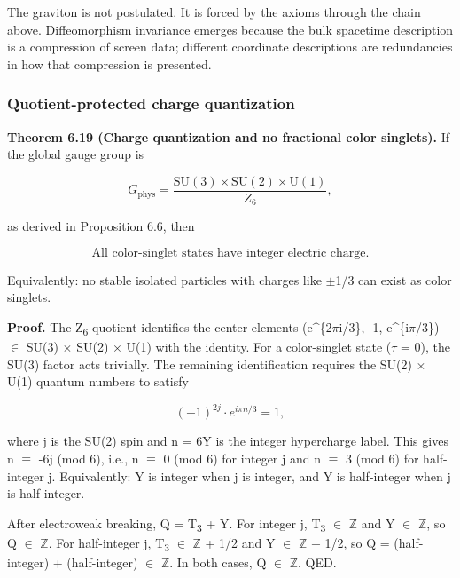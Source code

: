 The graviton is not postulated. It is forced by the axioms through the chain above. Diffeomorphism invariance emerges because the bulk spacetime description is a compression of screen data; different coordinate descriptions are redundancies in how that compression is presented.

\subsubsection{Quotient-protected charge quantization}\label{612-mass-predictions-from-symmetry}

\textbf{Theorem 6.19 (Charge quantization and no fractional color singlets).} If the global gauge group is

\[
G_{\mathrm{phys}} = \frac{\mathrm{SU}(3) \times \mathrm{SU}(2) \times \mathrm{U}(1)}{Z_6},
\]

as derived in Proposition 6.6, then

\[
\text{All color-singlet states have integer electric charge.}
\]

Equivalently: no stable isolated particles with charges like \ensuremath{\pm}1/3 can exist as color singlets.

\textbf{Proof.} The Z\textsubscript{6} quotient identifies the center elements (e\^{}\{2\ensuremath{\pi}i/3\}, -1, e\^{}\{i\ensuremath{\pi}/3\}) \ensuremath{\in} SU(3) \ensuremath{\times} SU(2) \ensuremath{\times} U(1) with the identity. For a color-singlet state (\ensuremath{\tau} = 0), the SU(3) factor acts trivially. The remaining identification requires the SU(2) \ensuremath{\times} U(1) quantum numbers to satisfy

\[
(-1)^{2j} \cdot e^{i\pi n/3} = 1,
\]

where j is the SU(2) spin and n = 6Y is the integer hypercharge label. This gives n \ensuremath{\equiv} -6j (mod 6), i.e., n \ensuremath{\equiv} 0 (mod 6) for integer j and n \ensuremath{\equiv} 3 (mod 6) for half-integer j. Equivalently: Y is integer when j is integer, and Y is half-integer when j is half-integer.

After electroweak breaking, Q = T\textsubscript{3} + Y. For integer j, T\textsubscript{3} \ensuremath{\in} \ensuremath{\mathbb{Z}} and Y \ensuremath{\in} \ensuremath{\mathbb{Z}}, so Q \ensuremath{\in} \ensuremath{\mathbb{Z}}. For half-integer j, T\textsubscript{3} \ensuremath{\in} \ensuremath{\mathbb{Z}} + 1/2 and Y \ensuremath{\in} \ensuremath{\mathbb{Z}} + 1/2, so Q = (half-integer) + (half-integer) \ensuremath{\in} \ensuremath{\mathbb{Z}}. In both cases, Q \ensuremath{\in} \ensuremath{\mathbb{Z}}. QED.

